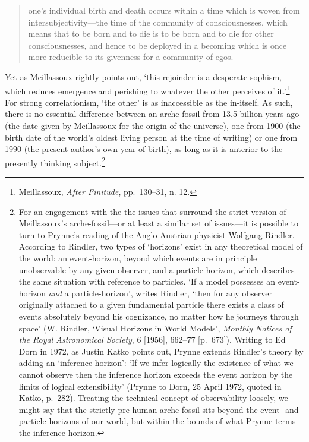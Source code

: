 \documentclass[]{article}
\begin{document}
\begin{quote}
\singlespacing one’s individual birth and death occurs within a time
which is woven from intersubjectivity—the time of the community of
consciousnesses, which means that to be born and to die is to be born
and to die for other consciousnesses, and hence to be deployed in a
becoming which is once more reducible to its givenness for a community
of egos.
\end{quote}

\noindent Yet as Meillassoux rightly points out, ‘this rejoinder is a
desperate sophism, which reduces emergence and perishing to whatever the
other perceives of it.’\footnote{Meillassoux, \emph{After Finitude},
  pp.~130–31, n. 12.} For strong correlationism, ‘the other’ is as
inaccessible as the in-itself. As such, there is no essential difference
between an arche-fossil from 13.5 billion years ago (the date given by
Meillassoux for the origin of the universe), one from 1900 (the birth
date of the world’s oldest living person at the time of writing) or one
from 1990 (the present author’s own year of birth), as long as it is
anterior to the presently thinking subject.\footnote{For an engagement
  with the the issues that surround the strict version of Meillassoux’s
  arche-fossil—or at least a similar set of issues—it is possible to
  turn to Prynne’s reading of the Anglo-Austrian physicist Wolfgang
  Rindler. According to Rindler, two types of ‘horizons’ exist in any
  theoretical model of the world: an event-horizon, beyond which events
  are in principle unobservable by any given observer, and a
  particle-horizon, which describes the same situation with reference to
  particles. ‘If a model possesses an event-horizon \emph{and} a
  particle-horizon’, writes Rindler, ‘then for any observer originally
  attached to a given fundamental particle there exists a class of
  events absolutely beyond his cognizance, no matter how he journeys
  through space’ (W. Rindler, ‘Visual Horizons in World Models’,
  \emph{Monthly Notices of the Royal Astronomical Society}, 6
  {[}1956{]}, 662–77 {[}p.~673{]}). Writing to Ed Dorn in 1972, as
  Justin Katko points out, Prynne extends Rindler’s theory by adding an
  ‘inference-horizon’: ‘If we infer logically the existence of what we
  cannot observe then the inference horizon exceeds the event horizon by
  the limits of logical extensibility’ (Prynne to Dorn, 25 April 1972,
  quoted in Katko, p.~282). Treating the technical concept of
  observability loosely, we might say that the strictly pre-human
  arche-fossil sits beyond the event- and particle-horizons of our
  world, but within the bounds of what Prynne terms the
  inference-horizon.}
\end{document}
